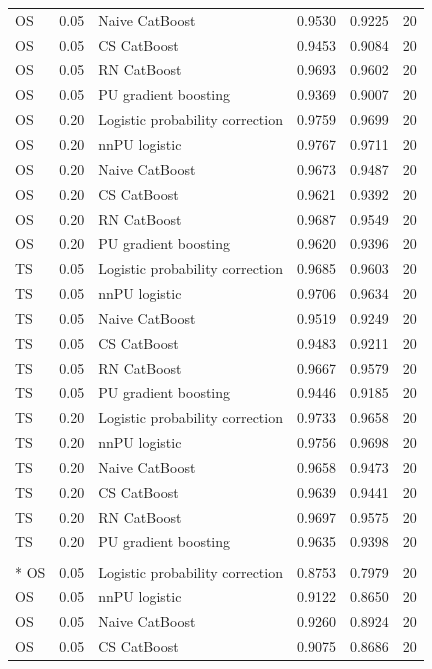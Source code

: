 \begin{longtable}{@{}p{0.65in}rp{2.85in}rrr@{}}
OS & 0.05 & Naive CatBoost & 0.9530 & 0.9225 & 20 \\
OS & 0.05 & CS CatBoost & 0.9453 & 0.9084 & 20 \\
OS & 0.05 & RN CatBoost & 0.9693 & 0.9602 & 20 \\
OS & 0.05 & PU gradient boosting & 0.9369 & 0.9007 & 20 \\
\addlinespace[2pt]
OS & 0.20 & Logistic probability correction & 0.9759 & 0.9699 & 20 \\
OS & 0.20 & nnPU logistic & 0.9767 & 0.9711 & 20 \\
OS & 0.20 & Naive CatBoost & 0.9673 & 0.9487 & 20 \\
OS & 0.20 & CS CatBoost & 0.9621 & 0.9392 & 20 \\
OS & 0.20 & RN CatBoost & 0.9687 & 0.9549 & 20 \\
OS & 0.20 & PU gradient boosting & 0.9620 & 0.9396 & 20 \\
\addlinespace[2pt]
TS & 0.05 & Logistic probability correction & 0.9685 & 0.9603 & 20 \\
TS & 0.05 & nnPU logistic & 0.9706 & 0.9634 & 20 \\
TS & 0.05 & Naive CatBoost & 0.9519 & 0.9249 & 20 \\
TS & 0.05 & CS CatBoost & 0.9483 & 0.9211 & 20 \\
TS & 0.05 & RN CatBoost & 0.9667 & 0.9579 & 20 \\
TS & 0.05 & PU gradient boosting & 0.9446 & 0.9185 & 20 \\
\addlinespace[2pt]
TS & 0.20 & Logistic probability correction & 0.9733 & 0.9658 & 20 \\
TS & 0.20 & nnPU logistic & 0.9756 & 0.9698 & 20 \\
TS & 0.20 & Naive CatBoost & 0.9658 & 0.9473 & 20 \\
TS & 0.20 & CS CatBoost & 0.9639 & 0.9441 & 20 \\
TS & 0.20 & RN CatBoost & 0.9697 & 0.9575 & 20 \\
TS & 0.20 & PU gradient boosting & 0.9635 & 0.9398 & 20 \\
\addlinespace[2pt]
\multicolumn{6}{l}{\textbf{Spambase}}\\*
OS & 0.05 & Logistic probability correction & 0.8753 & 0.7979 & 20 \\
OS & 0.05 & nnPU logistic & 0.9122 & 0.8650 & 20 \\
OS & 0.05 & Naive CatBoost & 0.9260 & 0.8924 & 20 \\
OS & 0.05 & CS CatBoost & 0.9075 & 0.8686 & 20 \\

\end{longtable}
